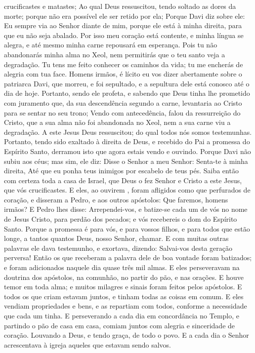 {{} crucificastes e matastes;
  Ao qual Deus ressuscitou, tendo soltado as dores da morte; porque não era possível ele ser retido por ela;
  Porque Davi diz sobre ele: Eu sempre via ao Senhor diante de mim, porque ele está à minha direita, para que eu não seja abalado.
  Por isso meu coração está contente, e minha língua se alegra, e até mesmo minha carne repousará em esperança.
  Pois tu não abandonarás minha alma no Xeol,
 nem permitirás que o teu santo veja a degradação.
  Tu tens me feito conhecer os caminhos da vida; tu me encherás de alegria com tua face.
  Homens irmãos, é lícito eu vos dizer abertamente sobre o patriarca Davi, que morreu, e foi sepultado, e a sepultura dele está conosco até o dia de hoje.
  Portanto, sendo ele profeta, e sabendo que Deus tinha lhe prometido com juramento que, da sua descendência
 segundo a carne, levantaria ao Cristo para se sentar no seu trono;
  Vendo
{} com antecedência, falou da ressurreição do Cristo, que a sua alma não foi abandonada no Xeol, nem a sua carne viu a degradação.
  A este Jesus Deus ressuscitou; do qual todos nós somos testemunhas.
  Portanto, tendo sido exaltado à direita de Deus, e recebido do Pai a promessa do Espírito Santo, derramou isto que agora estais vendo e ouvindo.
  Porque Davi não subiu aos céus; mas sim, ele diz: Disse o Senhor a meu Senhor: Senta-te à minha direita,
  Até que eu ponha teus inimigos por escabelo de teus pés.
  Saiba então com certeza toda a casa de Israel, que Deus o fez Senhor e Cristo a este Jesus, que vós crucificastes.
  E eles, ao ouvirem
{},  foram afligidos como que perfurados de coração, e disseram a Pedro, e aos outros apóstolos: Que faremos, homens irmãos?
  E Pedro lhes disse: Arrependei-vos, e batize-se cada um de vós no nome de Jesus Cristo, para perdão dos pecados; e vós recebereis o dom do Espírito Santo.
  Porque a promessa é para vós, e para vossos filhos, e para todos que
{} estão longe, a tantos quantos Deus, nosso Senhor, chamar.
  E com muitas outras palavras ele dava testemunho, e exortava, dizendo: Salvai-vos desta geração perversa!
  Então os que receberam a palavra dele de boa vontade foram batizados; e foram adicionados naquele dia quase três mil almas.
  E eles perseveravam na doutrina dos apóstolos, na comunhão, no partir do pão, e nas orações.
  E houve temor em toda alma; e muitos milagres e sinais foram feitos pelos apóstolos.
  E todos os que criam estavam juntos, e tinham todas as coisas em comum.
  E eles vendiam
{} propriedades e bens, e as repartiam com todos, conforme a necessidade que cada um tinha.
  E perseverando a cada dia em concordância no Templo, e partindo o pão de casa em casa, comiam juntos com alegria e sinceridade de coração.
  Louvando a Deus, e tendo graça,
{} de todo o povo. E a cada dia o Senhor acrescentava à igreja aqueles que estavam sendo salvos.
\par }

